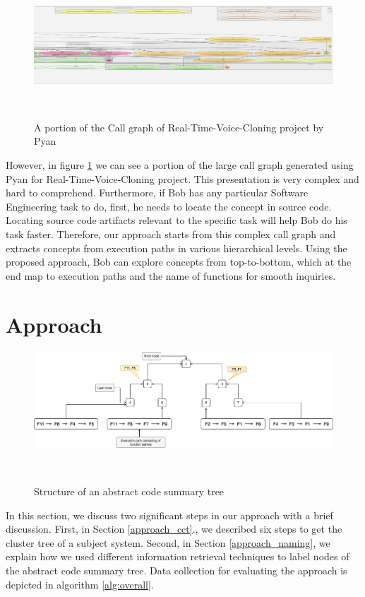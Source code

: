 \begin{figure}[tb]
  \centering
  \includegraphics[width=\columnwidth]{figures/hla1/realTime.png}
  \caption{A portion of the Call graph of Real-Time-Voice-Cloning project by Pyan}~\label{fig:realTime}
\end{figure}

However, in figure \ref{fig:realTime} we can see a portion of the large call graph generated using Pyan \cite{pyan} for Real-Time-Voice-Cloning \cite{realTime} project. This presentation is very complex and hard to comprehend. Furthermore, if Bob has any particular Software Engineering task to do, first, he needs to locate the concept in source code. Locating source code artifacts relevant to the specific task will help Bob do his task faster. Therefore, our approach starts from this complex call graph and extracts concepts from execution paths in various hierarchical levels. Using the proposed approach, Bob can explore concepts from top-to-bottom, which at the end map to execution paths and the name of functions for smooth inquiries. 


 
 
\section{Approach}

\begin{figure}[tb]
  \centering
  \includegraphics[width=\columnwidth]{figures/hla1/visual_tool_static_call_graph-2.png}
  \caption{Structure of an abstract code summary tree}~\label{fig:hla1_motivation}
\end{figure}
In this section, we discuss two significant steps in our approach with a brief discussion. First, in Section \ref{approach_cct}., we described six steps to get the cluster tree of a subject system. Second, in Section \ref{approach_naming}, we explain how we used different information retrieval techniques to label nodes of the abstract code summary tree. Data collection for evaluating the approach is depicted in algorithm \ref{alg:overall}.


